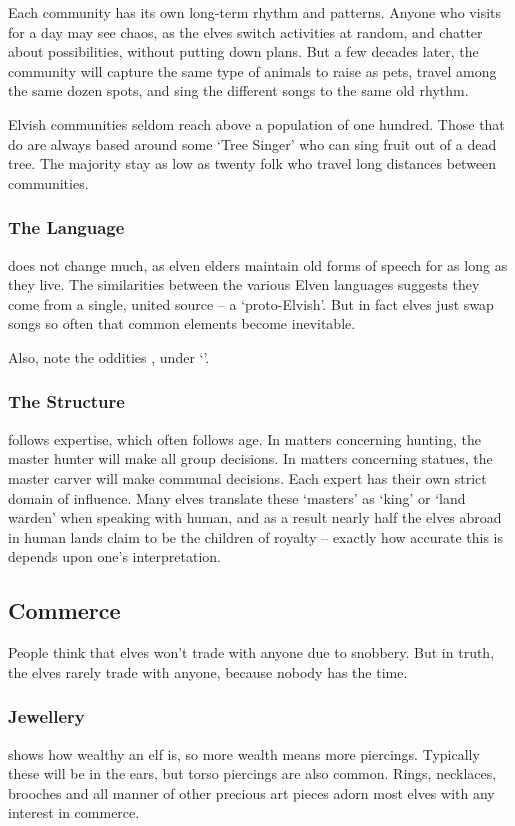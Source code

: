 \begin{multicols}{2}
Each community has its own long-term rhythm and patterns.
Anyone who visits for a day may see chaos, as the elves switch activities at random, and chatter about possibilities, without putting down plans.
But a few decades later, the community will capture the same type of animals to raise as pets, travel among the same dozen spots, and sing the different songs to the same old rhythm.

Elvish communities seldom reach above a population of one hundred.
Those that do are always based around some `Tree Singer' who can sing fruit out of a dead tree.
The majority stay as low as twenty folk who travel long distances between communities.

\subsubsection{The Language}
does not change much, as elven elders maintain old forms of speech for as long as they live.
The similarities between the various Elven languages suggests they come from a single, united source -- a `proto-Elvish'.
But in fact elves just swap songs so often that common elements become inevitable.

Also, note the oddities , under `'.

\subsubsection{The Structure}
follows expertise, which often follows age.
In matters concerning hunting, the master hunter will make all group decisions.
In matters concerning statues, the master carver will make communal decisions.
Each expert has their own strict domain of influence.
Many elves translate these `masters' as `king' or `land warden' when speaking with human, and as a result nearly half the elves abroad in human lands claim to be the children of royalty -- exactly how accurate this is depends upon one's interpretation.

\subsection{Commerce}

People think that elves won't trade with anyone due to snobbery.
But in truth, the elves rarely trade with anyone, because nobody has the time.

\subsubsection{Jewellery}
shows how wealthy an elf is, so more wealth means more piercings.
Typically these will be in the ears, but torso piercings are also common.
Rings, necklaces, brooches and all manner of other precious art pieces adorn most elves with any interest in commerce.


\end{multicols}
